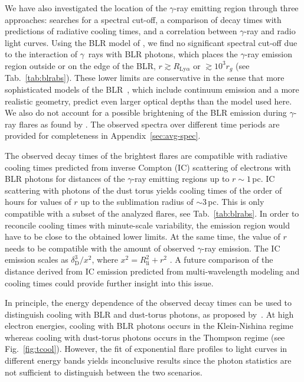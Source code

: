 \documentclass[twocolumn,linenumbers]{aastex62}
\newcommand{\Grays}{$\gamma$~rays\xspace}
\newcommand{\gray}{$\gamma$-ray\xspace}
\begin{document}
We have also investigated the location of the \gray emitting region  through three approaches: searches for a spectral cut-off, a comparison of decay times with predictions of radiative cooling times, and a correlation between \gray and radio light curves. 
Using the BLR model of \citet{finke2016}, we find no significant spectral cut-off due to the interaction of \Grays with BLR photons, which places the \gray emission region outside or on the edge of the BLR, $r \gtrsim R_{\mathrm{Ly}\alpha}$ or $\gtrsim 10^3r_g$ (see Tab.~\ref{tab:blrabs}). 
These lower limits are conservative in the sense that more sophisticated models of the BLR~\citep[e.g.,][]{2017MNRAS.464..152A}, which include continuum emission and a more realistic geometry, predict even larger optical depths than the model used here.
We also do not account for a possible brightening of the BLR emission during \gray flares as found by \citet{2013ApJ...763L..36L}.
The observed spectra over different time periods are provided for completeness in Appendix~\ref{sec:avg-spec}.

The observed decay times of the brightest flares are compatible with radiative cooling times predicted from inverse Compton (IC) scattering of electrons with BLR photons for distances of the \gray emitting regions up to $r\sim 1\,$pc. 
IC scattering with photons of the dust torus yields cooling times of the order of hours for values of $r$ up to the sublimation radius of $\sim 3\,$pc. 
This is only compatible with a subset of the analyzed flares, see Tab.~\ref{tab:blrabs}.
In order to reconcile cooling times with minute-scale variability, the emission region would have to be close to the obtained lower limits. 
At the same time, the value of $r$ needs to be compatible with the amount of observed \gray emission. The IC emission scales as $\delta_\mathrm{D}^3 / x^2$, where $x^2 = R_\mathrm{li}^2 + r^2$ \citep[see, e.g., Eq. 87 in][]{finke2016}. 
A future comparison of the distance derived from IC emission predicted from multi-wavelength modeling and cooling times could provide further insight into this issue.

In principle, the energy dependence of the observed decay times can be used to distinguish cooling with BLR and dust-torus photons, as proposed by~\citet{2012ApJ...758L..15D}. 
At high electron energies, cooling with BLR photons occurs in the Klein-Nishina regime whereas cooling with dust-torus photons occurs in the Thompson regime (see Fig.~\ref{fig:tcool}).
However, the fit of exponential flare profiles to light curves in different energy bands yields inconclusive results since the photon statistics are not sufficient to distinguish between the two scenarios.
\end{document}
